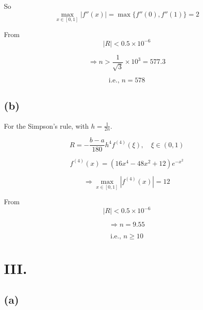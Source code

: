\documentclass[a4paper]{article}
\begin{document}
So
\[
\max_{x \in [0,1]} |f''(x)| = \max \{ f''(0), f''(1) \} = 2
\]

From
\begin{equation*}
|R| < 0.5 \times 10^{-6}
\end{equation*}

\begin{equation*}
\Rightarrow n > \frac{1}{\sqrt{3}} \times 10^3 = 577.3
\end{equation*}

\begin{equation*}
\text{i.e., } n = 578
\end{equation*}

\subsection*{(b)}

For the Simpson's rule, with $h = \frac{1}{2n}$.

\begin{equation*}
R = -\frac{b-a}{180} h^4 f^{(4)}(\xi), \quad \xi \in (0,1)
\end{equation*}

\begin{equation*}
f^{(4)}(x) = (16x^4 - 48x^2 + 12) e^{-x^2}
\end{equation*}

\begin{equation*}
\Rightarrow \max_{x \in [0,1]} |f^{(4)}(x)| = 12
\end{equation*}

From
\begin{equation*}
|R| < 0.5 \times 10^{-6}
\end{equation*}

\begin{equation*}
\Rightarrow n = 9.55
\end{equation*}

\begin{equation*}
\text{i.e., } n \geq 10
\end{equation*}

\section*{III.}

\subsection*{(a)}
\end{document}
